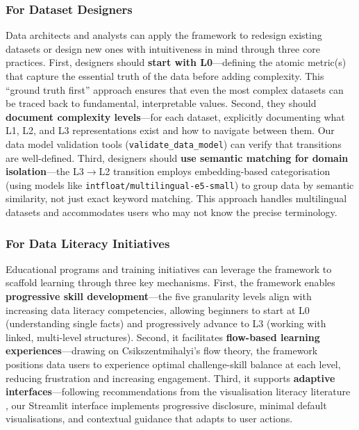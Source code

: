 \documentclass[12pt,a4paper]{article}
\begin{document}
\subsubsection{For Dataset Designers}

Data architects and analysts can apply the framework to redesign existing datasets or design new ones with intuitiveness in mind through three core practices. First, designers should \textbf{start with L0}---defining the atomic metric(s) that capture the essential truth of the data before adding complexity. This ``ground truth first'' approach ensures that even the most complex datasets can be traced back to fundamental, interpretable values. Second, they should \textbf{document complexity levels}---for each dataset, explicitly documenting what L1, L2, and L3 representations exist and how to navigate between them. Our data model validation tools (\texttt{validate\_data\_model}) can verify that transitions are well-defined. Third, designers should \textbf{use semantic matching for domain isolation}---the L3$\to$L2 transition employs embedding-based categorisation (using models like \texttt{intfloat/multilingual-e5-small}) to group data by semantic similarity, not just exact keyword matching. This approach handles multilingual datasets and accommodates users who may not know the precise terminology.

\subsubsection{For Data Literacy Initiatives}

Educational programs and training initiatives can leverage the framework to scaffold learning through three key mechanisms. First, the framework enables \textbf{progressive skill development}---the five granularity levels align with increasing data literacy competencies, allowing beginners to start at L0 (understanding single facts) and progressively advance to L3 (working with linked, multi-level structures). Second, it facilitates \textbf{flow-based learning experiences}---drawing on Csikszentmihalyi's flow theory, the framework positions data users to experience optimal challenge-skill balance at each level, reducing frustration and increasing engagement. Third, it supports \textbf{adaptive interfaces}---following recommendations from the visualisation literacy literature \citep{alhamadi2022dataqualitymismatched, amyrotos2021adaptivevisualisationsfor}, our Streamlit interface implements progressive disclosure, minimal default visualisations, and contextual guidance that adapts to user actions.
\end{document}
